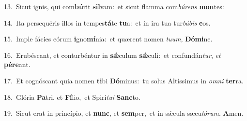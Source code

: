 {\numbfont\textcolor{\numbcolor}{13.}}~Sicut ignis, qui com\-\textbf{bú}\-rit \textbf{sil}\-vam:~\star et sicut flamma com\-\textit{bú}\-\textit{rens} \textbf{mon}\-tes:\par
{\numbfont\textcolor{\numbcolor}{14.}}~Ita persequéris illos in tempes\-\textbf{tá}\-te \textbf{tu}\-a:~\star et in ira tua tur\-\textit{bá}\-\textit{bis} \textbf{e}\-os.\par
{\numbfont\textcolor{\numbcolor}{15.}}~Imple fácies eórum \textbf{i}\-gno\-\textbf{mí}\-nia:~\star et quærent nomen \textit{tu}\-\textit{um}, \textbf{Dó}\-\textbf{mi}ne.\par
{\numbfont\textcolor{\numbcolor}{16.}}~Erubéscant, et conturbéntur in \textbf{sǽ}\-culum \textbf{sǽ}\-culi:~\star et confundán\-\textit{tur}\-, \textit{et} \textbf{pér}\-\textbf{e}ant.\par
{\numbfont\textcolor{\numbcolor}{17.}}~Et cognóscant quia nomen \textbf{ti}\-bi \textbf{Dó}\-minus:~\star tu solus Altíssimus in \textit{om}\-\textit{ni} \textbf{ter}\-ra.\par
{\numbfont\textcolor{\numbcolor}{18.}}~Glória \textbf{Pa}\-tri, et \textbf{Fí}\-lio,~\star et Spirí\-\textit{tu}\-\textit{i} \textbf{Sanc}\-to.\par
{\numbfont\textcolor{\numbcolor}{19.}}~Sicut erat in princípio, et \textbf{nunc}\-, et \textbf{sem}\-per,~\star et in sǽcula sæcu\-\textit{ló}\-\textit{rum}. \textbf{A}\-men.\par
